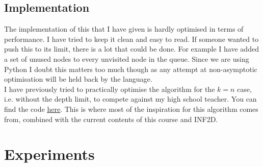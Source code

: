 \documentclass{article}
\begin{document}
\subsection{Implementation}

The implementation of this that I have given is hardly optimised in terms
of performance. I have tried to keep it clean and easy to read. If
someone wanted to push this to its limit, there is a lot that could be done.
For example I have added a set of unused nodes to every unvisited node in the
queue. Since we are using Python I doubt this matters too much though as any 
attempt at non-asymptotic optimisation will be held back by the language.\\
I have previously tried to practically optimise the algorithm for the $k=n$ 
case, i.e. without the depth limit, to compete against my high school teacher.
You can find the code \underline{\href{https://github.com/miltfra/tsp}{here}}.
This is where most of the inspiration for this algorithm comes from, combined
with the current contents of this course and INF2D.

\section{Experiments}
\end{document}
